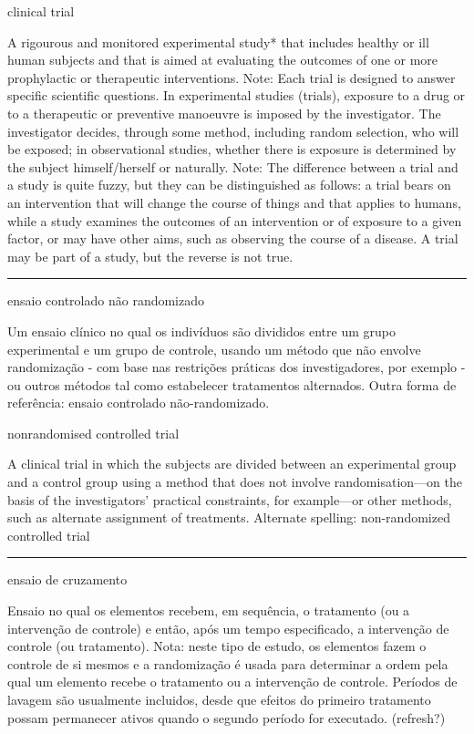 \documentclass[
]{book}
\begin{document}
clinical trial

A rigourous and monitored experimental study* that includes healthy or ill human subjects and that is aimed at evaluating the outcomes of one or more prophylactic or therapeutic interventions. Note: Each trial is designed to answer specific scientific questions. In experimental studies (trials), exposure to a drug or to a therapeutic or preventive manoeuvre is imposed by the investigator. The investigator decides, through some method, including random selection, who will be exposed; in observational studies, whether there is exposure is determined by the subject himself/herself or naturally.
Note: The difference between a trial and a study is quite fuzzy, but they can be distinguished as follows: a trial bears on an intervention that will change the course of things and that applies to humans, while a study examines the outcomes of an intervention or of exposure to a given factor, or may have other aims, such as observing the course of a disease. A trial may be part of a study, but the reverse is not true.

\begin{center}\rule{0.5\linewidth}{0.5pt}\end{center}

ensaio controlado não randomizado

Um ensaio clínico no qual os indivíduos são divididos entre um grupo experimental e um grupo de controle, usando um método que não envolve randomização - com base nas restrições práticas dos investigadores, por exemplo - ou outros métodos tal como estabelecer tratamentos alternados. Outra forma de referência: ensaio controlado não-randomizado.

nonrandomised controlled trial

A clinical trial in which the subjects are divided between an experimental group and a control group using a method that does not involve randomisation---on the basis of the investigators' practical constraints, for example---or other methods, such as alternate assignment of treatments. Alternate spelling: non-randomized controlled trial

\begin{center}\rule{0.5\linewidth}{0.5pt}\end{center}

ensaio de cruzamento

Ensaio no qual os elementos recebem, em sequência, o tratamento (ou a intervenção de controle) e então, após um tempo especificado, a intervenção de controle (ou tratamento). Nota: neste tipo de estudo, os elementos fazem o controle de si mesmos e a randomização é usada para determinar a ordem pela qual um elemento recebe o tratamento ou a intervenção de controle. Períodos de lavagem são usualmente incluidos, desde que efeitos do primeiro tratamento possam permanecer ativos quando o segundo período for executado. (refresh?)
\end{document}
